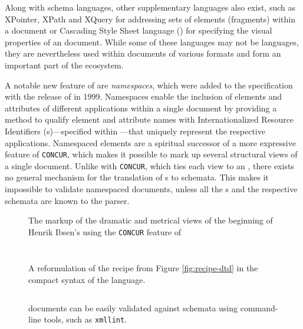 \documentclass{book}
\begin{document}
        Along with schema languages, other supplementary languages also exist,
        such as XPointer, XPath and XQuery for addressing sets of elements
        (fragments) within a  document or Cascading Style Sheet
        language () for specifying the visual properties of an
         document. While some of these languages may not be
         languages, they are nevertheless used within documents of
        various  formats and form an important part of the
         ecosystem.

        A notable new feature of  are \emph{namespaces}, which
        were added to the specification with the release of \cite{bray99} in
        1999. Namespaces enable the inclusion of elements and attributes of
        different  applications within a single 
        document by providing a method to qualify element and attribute names
        with Internationalized Resource Identifiers (s)---specified
        within \cite{rfc3987}---that uniquely represent the respective
         applications. Namespaced elements are a spiritual
        successor of a more expressive  feature of
        \texttt{CONCUR}, which makes it possible to mark up several structural
        views of a single document. Unlike with \texttt{CONCUR}, which ties each
        view to an  , there exists no general
        mechanism for the translation of s to 
        schemata. This makes it impossible to validate namespaced 
        documents, unless all the s and the respective schemata are
        known to the parser.

        \begin{figure}[hb!]
          
          \caption{The markup of the dramatic and metrical views of the
            beginning of Henrik Ibsen's  using the
            \texttt{CONCUR} feature of }
        \end{figure}


        \begin{figure}[H]
          \inputminted{xml}{examples/02/recipe.xsd}
          \caption{A reformulation of the recipe  from Figure
            \ref{fig:recipe-dtd} in the  Schema language.%
            }
          \label{fig:recipe-xsd}
          \inputminted{text}{examples/02/recipe.rnc}
          \caption{A reformulation of the recipe  from Figure
            \ref{fig:recipe-dtd} in the compact syntax of the 
            language.}
          \label{fig:recipe-rnc}
          \inputminted{sh}{examples/02/recipe.sh}
          \caption{ documents can be easily validated against
             schemata using command-line tools, such as
            \texttt{xmllint}.}
        \end{figure}
\end{document}

